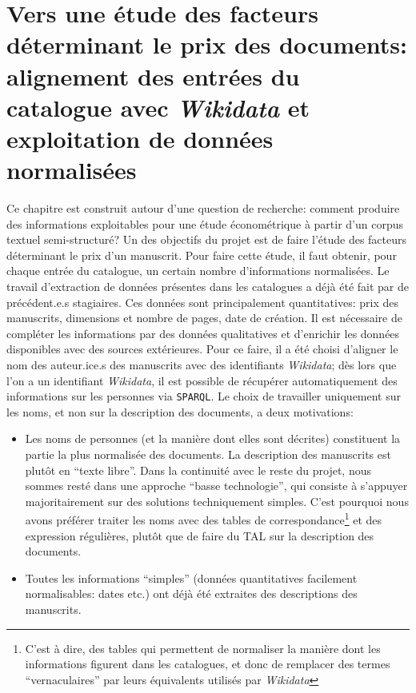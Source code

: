 \documentclass[a4paper, 12pt, twoside]{book}
\newcommand{\rgxpl}{\glspl{expression régulière}}
\newcommand{\sparql}{\texttt{\gls{SPARQL}}}
\newcommand{\wkd}{\textit{Wikidata}}
\begin{document}
\chapter{Vers une étude des facteurs déterminant le prix des documents: alignement des entrées du catalogue avec \wkd{} et exploitation de données normalisées}
Ce chapitre est construit autour d'une question de recherche: comment produire des informations exploitables pour une étude économétrique à partir d'un corpus textuel semi-structuré? Un des objectifs du projet est de faire l'étude des facteurs déterminant le prix d'un manuscrit. Pour faire cette étude, il faut obtenir, pour chaque entrée du catalogue, un certain nombre d'informations normalisées. Le travail d'extraction de données présentes dans les catalogues a déjà été fait par de précédent.e.s stagiaires. Ces données sont principalement quantitatives: prix des manuscrits, dimensions et nombre de pages, date de création. Il est nécessaire de compléter les informations par des données qualitatives et d'enrichir les données disponibles avec des sources extérieures. Pour ce faire, il a été choisi d'aligner le nom des auteur.ice.s des manuscrits avec des identifiants \wkd{}; dès lors que l'on a un identifiant \wkd{}, il est possible de récupérer automatiquement des informations sur les personnes via \sparql. Le choix de travailler uniquement sur les noms, et non sur la description des documents, a deux motivations:
\begin{itemize}
	\item Les noms de personnes (et la manière dont elles sont décrites) constituent la partie la plus normalisée des documents. La description des manuscrits est plutôt en \enquote{texte libre}. Dans la continuité avec le reste du projet, nous sommes resté dans une approche \enquote{basse technologie}, qui consiste à s'appuyer majoritairement sur des solutions techniquement simples. C'est pourquoi nous avons préférer traiter les noms avec des tables de correspondance\footnote{C'est à dire, des tables qui permettent de normaliser la manière dont les informations figurent dans les catalogues, et donc de remplacer des termes \enquote{vernaculaires} par leurs équivalents utilisés par \wkd{}} et des \rgxpl{}, plutôt que de faire du TAL sur la description des documents.
	\item Toutes les informations \enquote{simples} (données quantitatives facilement normalisables: dates etc.) ont déjà été extraites des descriptions des manuscrits.
\end{itemize}
\end{document}
